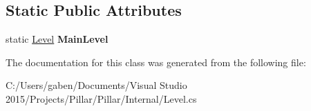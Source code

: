 \subsection*{Static Public Attributes}
\begin{DoxyCompactItemize}
\item 
\mbox{\label{class_pillar3_d_1_1_level_a6ebfe0dcd9467a921473d1d65bd81e79}} 
static \hyperlink{class_pillar3_d_1_1_level}{Level} {\bfseries Main\+Level}
\end{DoxyCompactItemize}


The documentation for this class was generated from the following file\+:\begin{DoxyCompactItemize}
\item 
C\+:/\+Users/gaben/\+Documents/\+Visual Studio 2015/\+Projects/\+Pillar/\+Pillar/\+Internal/Level.\+cs\end{DoxyCompactItemize}
